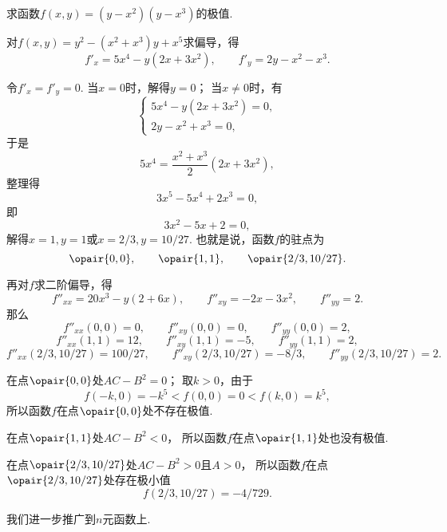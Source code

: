 \begin{example}
求函数\(f(x,y) = (y-x^2)(y-x^3)\)的极值.
\begin{solution}
对\(f(x,y) = y^2 - (x^2+x^3) y + x^5\)求偏导，得\[
f'_x = 5x^4 - y(2x+3x^2),
\qquad
f'_y = 2y - x^2 - x^3.
\]

令\(f'_x = f'_y = 0\).
当\(x=0\)时，解得\(y = 0\)；
当\(x\neq0\)时，有\[
\begin{cases}
5x^4-y(2x+3x^2) = 0, \\
2y-x^2+x^3 = 0,
\end{cases}
\]于是\[
5x^4 = \frac{x^2+x^3}{2}(2x+3x^2),
\]整理得\[
3x^5-5x^4+2x^3=0,
\]即\[
3x^2-5x+2=0,
\]解得\(x=1,y=1\)或\(x=2/3,y=10/27\).
也就是说，函数\(f\)的驻点为\[
\opair{0,0}, \qquad
\opair{1,1}, \qquad
\opair{2/3,10/27}.
\]

再对\(f\)求二阶偏导，得\[
f''_{xx} = 20x^3 - y(2+6x),
\qquad
f''_{xy} = -2x-3x^2,
\qquad
f''_{yy} = 2.
\]
那么
\[
f''_{xx}(0,0) = 0,
\qquad
f''_{xy}(0,0) = 0,
\qquad
f''_{yy}(0,0) = 2,
\]\[
f''_{xx}(1,1) = 12,
\qquad
f''_{xy}(1,1) = -5,
\qquad
f''_{yy}(1,1) = 2,
\]\[
f''_{xx}(2/3,10/27) = 100/27,
\qquad
f''_{xy}(2/3,10/27) = -8/3,
\qquad
f''_{yy}(2/3,10/27) = 2.
\]

在点\(\opair{0,0}\)处\(AC-B^2 = 0\)；
取\(k>0\)，由于\[
f(-k,0) = -k^5 < f(0,0) = 0 < f(k,0) = k^5,
\]所以函数\(f\)在点\(\opair{0,0}\)处不存在极值.

在点\(\opair{1,1}\)处\(AC-B^2 < 0\)，
所以函数\(f\)在点\(\opair{1,1}\)处也没有极值.

在点\(\opair{2/3,10/27}\)处\(AC-B^2 > 0\)且\(A>0\)，
所以函数\(f\)在点\(\opair{2/3,10/27}\)处存在极小值\[
f(2/3,10/27) = -4/729.
\]
\end{solution}
\end{example}

我们进一步推广到\(n\)元函数上.
\begingroup
\def\x{\mat{X}}
\def\X#1{\x_{#1}}
\def\z{\mat{0}}

